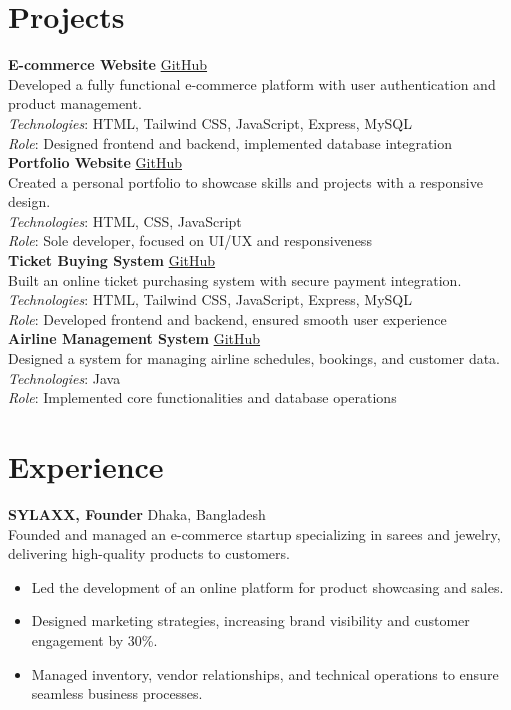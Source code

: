 \documentclass[11pt,a4paper]{article}
\begin{document}
\section{Projects}
\textbf{E-commerce Website} \hfill \href{https://github.com/ajjiadd}{GitHub} \\
Developed a fully functional e-commerce platform with user authentication and product management. \\
\textit{Technologies}: HTML, Tailwind CSS, JavaScript, Express, MySQL \\
\textit{Role}: Designed frontend and backend, implemented database integration \\[0.2cm]
\textbf{Portfolio Website} \hfill \href{https://github.com/ajjiadd}{GitHub} \\
Created a personal portfolio to showcase skills and projects with a responsive design. \\
\textit{Technologies}: HTML, CSS, JavaScript \\
\textit{Role}: Sole developer, focused on UI/UX and responsiveness \\[0.2cm]
\textbf{Ticket Buying System} \hfill \href{https://github.com/ajjiadd}{GitHub} \\
Built an online ticket purchasing system with secure payment integration. \\
\textit{Technologies}: HTML, Tailwind CSS, JavaScript, Express, MySQL \\
\textit{Role}: Developed frontend and backend, ensured smooth user experience \\[0.2cm]
\textbf{Airline Management System} \hfill \href{https://github.com/ajjiadd}{GitHub} \\
Designed a system for managing airline schedules, bookings, and customer data. \\
\textit{Technologies}: Java \\
\textit{Role}: Implemented core functionalities and database operations

\section{Experience}
\textbf{SYLAXX, Founder} \hfill Dhaka, Bangladesh \\
Founded and managed an e-commerce startup specializing in sarees and jewelry, delivering high-quality products to customers. \\
\begin{itemize}
    \item Led the development of an online platform for product showcasing and sales.
    \item Designed marketing strategies, increasing brand visibility and customer engagement by 30\%.
    \item Managed inventory, vendor relationships, and technical operations to ensure seamless business processes.
\end{itemize}
\end{document}
